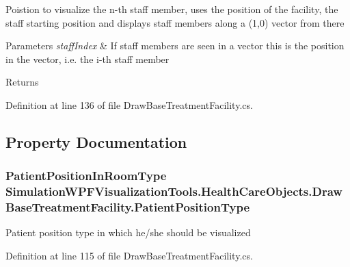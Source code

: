 Poistion to visualize the n-\/th staff member, uses the position of the facility, the staff starting position and displays staff members along a (1,0) vector from there 


\begin{DoxyParams}{Parameters}
{\em staff\+Index} & If staff members are seen in a vector this is the position in the vector, i.\+e. the i-\/th staff member\\
\hline
\end{DoxyParams}
\begin{DoxyReturn}{Returns}

\end{DoxyReturn}


Definition at line 136 of file Draw\+Base\+Treatment\+Facility.\+cs.



\subsection{Property Documentation}
\subsubsection[{\texorpdfstring{Patient\+Position\+Type}{PatientPositionType}}]{\setlength{\rightskip}{0pt plus 5cm}Patient\+Position\+In\+Room\+Type Simulation\+W\+P\+F\+Visualization\+Tools.\+Health\+Care\+Objects.\+Draw\+Base\+Treatment\+Facility.\+Patient\+Position\+Type\hspace{0.3cm}{\ttfamily [get]}}\hypertarget{class_simulation_w_p_f_visualization_tools_1_1_health_care_objects_1_1_draw_base_treatment_facility_a72a332150c43cfcea5695a0d92e0523c}{}\label{class_simulation_w_p_f_visualization_tools_1_1_health_care_objects_1_1_draw_base_treatment_facility_a72a332150c43cfcea5695a0d92e0523c}


Patient position type in which he/she should be visualized 



Definition at line 115 of file Draw\+Base\+Treatment\+Facility.\+cs.

